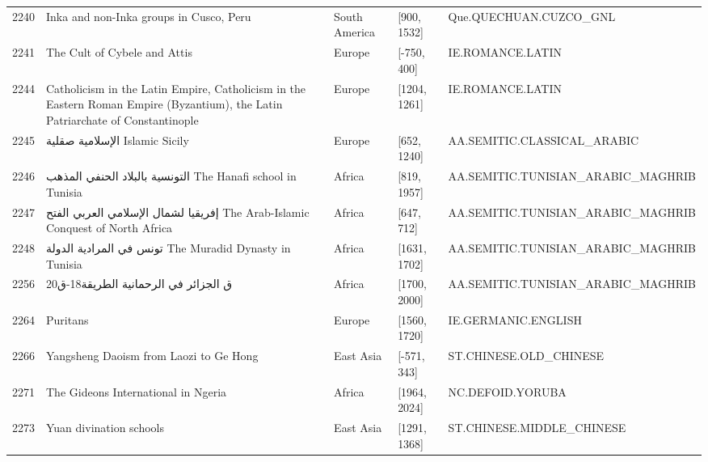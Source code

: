 {\begin{longtable}{rp{3.5cm}llp{3.5cm}}
2240 & {\raggedright Inka and non-Inka groups in Cusco, Peru} & South America & [900, 1532] & {\raggedright Que.\allowbreak{}QUECHUAN.\allowbreak{}CUZCO\_\allowbreak{}GNL} \\
2241 & {\raggedright The Cult of Cybele and Attis} & Europe & [-750, 400] & {\raggedright IE.\allowbreak{}ROMANCE.\allowbreak{}LATIN} \\
2244 & {\raggedright Catholicism in the Latin Empire, Catholicism in the Eastern Roman Empire (Byzantium), the Latin Patriarchate of Constantinople} & Europe & [1204, 1261] & {\raggedright IE.\allowbreak{}ROMANCE.\allowbreak{}LATIN} \\
2245 & {\raggedright {\arabicfont الإسلامية صقلية} Islamic Sicily} & Europe & [652, 1240] & {\raggedright AA.\allowbreak{}SEMITIC.\allowbreak{}CLASSICAL\_\allowbreak{}ARABIC} \\
2246 & {\raggedright {\arabicfont التونسية بالبلاد الحنفي المذهب} The Hanafi school in Tunisia} & Africa & [819, 1957] & {\raggedright AA.\allowbreak{}SEMITIC.\allowbreak{}TUNISIAN\_\allowbreak{}ARABIC\_\allowbreak{}MAGHRIB} \\
2247 & {\raggedright {\arabicfont إفريقيا لشمال الإسلامي العربي الفتح} The Arab-Islamic Conquest of North Africa} & Africa & [647, 712] & {\raggedright AA.\allowbreak{}SEMITIC.\allowbreak{}TUNISIAN\_\allowbreak{}ARABIC\_\allowbreak{}MAGHRIB} \\
2248 & {\raggedright {\arabicfont تونس في المرادية الدولة} The Muradid Dynasty in Tunisia} & Africa & [1631, 1702] & {\raggedright AA.\allowbreak{}SEMITIC.\allowbreak{}TUNISIAN\_\allowbreak{}ARABIC\_\allowbreak{}MAGHRIB} \\
2256 & {\raggedright {\arabicfont ق  الجزائر في الرحمانية الطريقة}18-{\arabicfont ق}20} & Africa & [1700, 2000] & {\raggedright AA.\allowbreak{}SEMITIC.\allowbreak{}TUNISIAN\_\allowbreak{}ARABIC\_\allowbreak{}MAGHRIB} \\
2264 & {\raggedright Puritans} & Europe & [1560, 1720] & {\raggedright IE.\allowbreak{}GERMANIC.\allowbreak{}ENGLISH} \\
2266 & {\raggedright Yangsheng Daoism from Laozi to Ge Hong} & East Asia & [-571, 343] & {\raggedright ST.\allowbreak{}CHINESE.\allowbreak{}OLD\_\allowbreak{}CHINESE} \\
2271 & {\raggedright The Gideons International in Ngeria} & Africa & [1964, 2024] & {\raggedright NC.\allowbreak{}DEFOID.\allowbreak{}YORUBA} \\
2273 & {\raggedright Yuan divination schools} & East Asia & [1291, 1368] & {\raggedright ST.\allowbreak{}CHINESE.\allowbreak{}MIDDLE\_\allowbreak{}CHINESE} \\

\end{longtable}}
